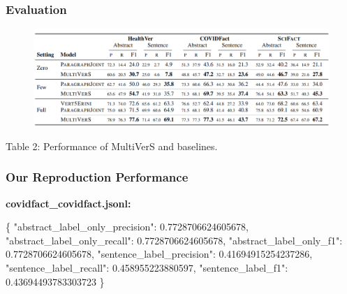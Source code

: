 \documentclass[13.5pt,aspecratio=169, xcolor=dvipsnames]{beamer}
\begin{document}
\begin{frame}
    \onehalfspacing
        \frametitle{Evaluation}
        \begin{figure}[h]
            \centering
            \includegraphics[width=\textwidth]{Results.png}
        \end{figure}
        \begin{center}
            Table 2: Performance of MultiVerS and baselines.
        \end{center}
    
\end{frame}
\begin{frame}[fragile]
    \onehalfspacing
        \frametitle{Our Reproduction Performance}
        \textbf{covidfact\_covidfact.jsonl:}
        \vspace*{-1em} 
        \begin{mybox}
        \begin{semiverbatim}
\{
    "abstract_label_only_precision": 0.7728706624605678,
    "abstract_label_only_recall": 0.7728706624605678,
    "abstract_label_only_f1": 0.7728706624605678,
    "sentence_label_precision": 0.41694915254237286,
    "sentence_label_recall": 0.458955223880597,
    "sentence_label_f1": 0.43694493783303723
\}\end{semiverbatim}
    \end{mybox}
\end{frame}



\end{document}
